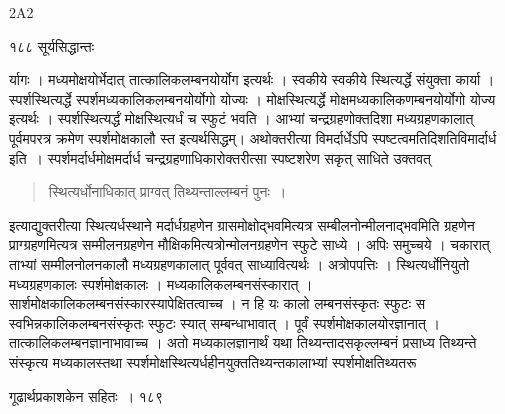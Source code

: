 \documentclass[11pt, openany]{book}
\begin{document}
{\tiny{2A2}}

\newpage


\noindent १८८ \hspace{4cm} सूर्यसिद्धान्तः
\vspace{1cm}

\begin{sloppypar}
\noindent र्यागः । मध्यमोक्षयोर्भेदात् तात्कालिकलम्बनयोर्योग इत्यर्थः । स्वकीये स्वकीये स्थित्यर्द्धे संयुक्ता कार्या । स्पर्शस्थित्यर्द्धे स्पर्शमध्यकालिकलम्बनयोर्योगो योज्यः । मोक्षस्थित्यर्द्धे मोक्षमध्यकालिकणम्बनयोर्योगो योज्य इत्यर्थः । स्पर्शस्थित्यर्द्धं मोक्षस्थित्यर्धं च स्फुटं भवति । आभ्यां चन्द्रग्रहणोक्तदिशा मध्यग्रहणकालात् पूर्वमपरत्र क्रमेण स्पर्शमोक्षकालौ स्त इत्यर्थसिद्धम्। अथोक्तरीत्या विमर्दार्धेऽपि स्पष्टत्वमतिदिशति\textendash विमार्दार्ध इति~। स्पर्शमर्दार्धमोक्षमर्दार्ध चन्द्रग्रहणाधिकारोक्तरीत्सा स्पष्टशरेण सकृत् साधिते उक्तवत्\textendash
\end{sloppypar}


\begin{quote}
 {\qt स्थित्यर्धोनाधिकात् प्राग्वत् तिथ्यन्ताल्लम्बनं पुनः~।}
 \end{quote}

\begin{sloppypar}
\noindent इत्याद्युक्तरीत्या स्थित्यर्धस्थाने मर्दार्धग्रहणेन ग्रासमोक्षोद्भवमित्यत्र सम्बीलनोन्मीलनाद्भवमिति ग्रहणेन प्राग्ग्रहणमित्यत्र सम्मीलनग्रहणेन मौक्षिकमित्यत्रोन्मोलनग्रहणेन स्फुटे साध्ये । अपिः समुच्चये । चकारात् ताभ्यां सम्मीलनोलनकालौ मध्यग्रहणकालात् पूर्ववत् साध्यावित्यर्थः । अत्रोपपत्तिः । स्थित्यर्धोनियुतो मध्यग्रहणकालः स्पर्शमोक्षकालः । मध्यकालिकलम्बनसंस्कारात् । सार्शमोक्षकालिकलम्बनसंस्कारस्यापेक्षितत्वाच्च । न हि यः कालो लम्बनसंस्कृतः स्फुटः स स्वभिन्नकालिकलम्बनसंस्कृतः स्फुटः स्यात् सम्बन्धाभावात् । पूर्वं स्पर्शमोक्षकालयोरज्ञानात् । तात्कालिकलम्बनज्ञानाभावाच्च । अतो मध्यकालज्ञानार्थं यथा तिथ्यन्तादसकृल्लम्बनं प्रसाध्य तिथ्यन्ते संस्कृत्य मध्यकालस्तथा स्पर्शमोक्षस्थित्यर्धहीनयुक्ततिथ्यन्तकालाभ्यां स्पर्शमोक्षतिथ्यतरू\textendash
\end{sloppypar}

\newpage




 \hspace{3cm} गूढार्थप्रकाशकेन सहितः~। \hfill १८९
\vspace{1cm}
\end{document}
